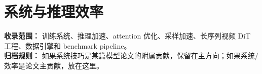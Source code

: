 
\section*{系统与推理效率}
{}

\begin{conceptbox}
\textbf{收录范围：} 训练系统、推理加速、attention 优化、采样加速、长序列视频 DiT 工程、数据引擎和 benchmark pipeline。\\
\textbf{归档规则：} 如果系统技巧是某篇模型论文的附属贡献，保留在主方向；如果系统/效率是论文主贡献，放在这里。
\end{conceptbox}

